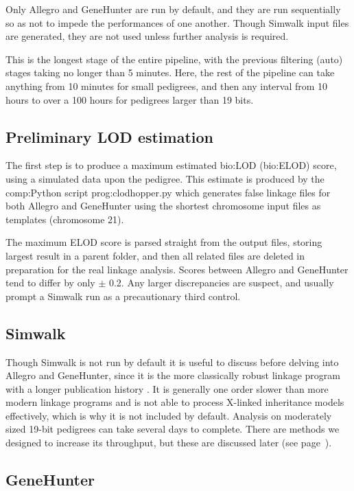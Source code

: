 Only Allegro and GeneHunter are run by default, and they are run sequentially so as not to impede the performances of one another. Though Simwalk input files are generated, they are not used unless further analysis is required.

This is the longest stage of the entire pipeline, with the previous filtering (auto) stages taking no longer than 5 minutes. Here, the rest of the pipeline can take anything from 10 minutes for small pedigrees, and then any interval from 10 hours to over a 100 hours for pedigrees larger than 19 bits.

\subsection{Preliminary LOD estimation}

The first step is to produce a maximum estimated \gls{bio:LOD} (\gls{bio:ELOD}) score, using a simulated data upon the pedigree. This estimate is produced by the \gls{comp:Python} script \gls{prog:clodhopper.py} which generates false linkage files for both Allegro and GeneHunter using the shortest chromosome input files as templates (chromosome 21).

The maximum ELOD score is parsed straight from the output files, storing largest result in a parent folder, and then all related files are deleted in preparation for the real linkage analysis. Scores between Allegro and GeneHunter tend to differ by only $\pm$ 0.2. Any larger discrepancies are suspect, and usually prompt a Simwalk run as a precautionary third control.

\subsection{Simwalk}

Though Simwalk is not run by default it is useful to discuss before delving into Allegro and GeneHunter, since it is the more classically robust linkage program with a longer publication history \cite{simwalk}. It is generally one order slower than more modern linkage programs and is not able to process X-linked inheritance models effectively, which is why it is not included by default. Analysis on moderately sized 19-bit pedigrees can take several days to complete. There are methods we designed to increase its throughput, but these are discussed later (see page~\pageref{ref:meth:simwalkmulti}).\enlargethispage{\baselineskip}


\subsection{GeneHunter}

